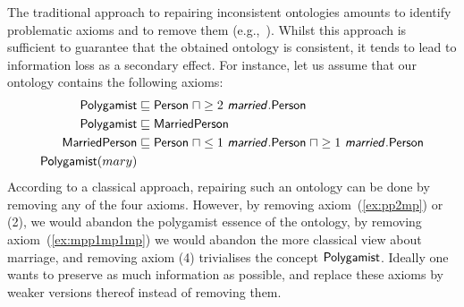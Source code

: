 \documentclass[
]{ceurart}
\begin{document}
The traditional approach to repairing inconsistent ontologies amounts to identify problematic axioms and to remove them (e.g.,~\cite{ScCo03,kalyanpur2005debugging,kalyanpur2006repairing,BaPS07}). Whilst this approach is sufficient to guarantee that the obtained ontology is consistent, it tends to lead to information loss as a secondary effect. For instance, let us assume that our ontology contains the following axioms:
%
\begin{align}
\label{ex:pp2mp}
\textsf{Polygamist} & \sqsubseteq \textsf{Person} \;\sqcap \geq 2~\textsf{\textsl{married}}.\textsf{Person}\\
\label{ex:pmp}
\textsf{Polygamist} & \sqsubseteq \textsf{MarriedPerson}\\
\label{ex:mpp1mp1mp}
\textsf{MarriedPerson} & \sqsubseteq \textsf{Person} \;\sqcap \leq 1~\textsf{\textsl{married}}.\textsf{Person} \;\sqcap \geq 1~\textsf{\textsl{married}}.\textsf{Person}\\
\label{ex:pmary}
\textsf{Polygamist}(mary) &
\end{align}
According to a classical approach, repairing such an ontology can be done by removing any of the four axioms. %
However, by removing axiom~(\ref{ex:pp2mp}) or (2), we would  abandon the polygamist essence of the ontology, by removing axiom~(\ref{ex:mpp1mp1mp}) we would abandon the more classical view about marriage, and removing axiom (4) trivialises the concept $\textsf{Polygamist}$. 
Ideally one wants to preserve as much information as possible, and replace these axioms by weaker versions thereof instead of removing them. 
\end{document}
